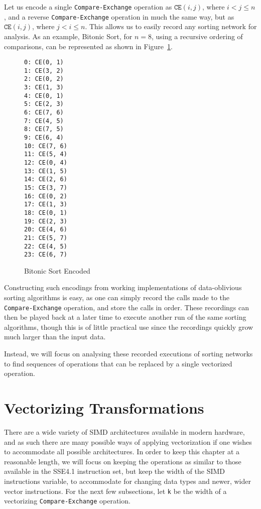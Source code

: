 Let us encode a single \texttt{Compare-Exchange} operation as $\mathtt{CE}(i,j)$, where $i < j \le n$, and a reverse \texttt{Compare-Exchange} operation in much the same way, but as  $\mathtt{CE}(i,j)$, where $j < i \le n$. This allows us to easily record any sorting network for analysis. As an example, Bitonic Sort, for $n = 8$, using a recursive ordering of comparisons, can be  represented as shown in Figure~\ref{fig:BitonicCE}.

\begin{figure}
\begin{multicols}{3}
\begin{verbatim}
0: CE(0, 1)
1: CE(3, 2)
2: CE(0, 2)
3: CE(1, 3)
4: CE(0, 1)
5: CE(2, 3)
6: CE(7, 6)
7: CE(4, 5)
8: CE(7, 5)
9: CE(6, 4)
10: CE(7, 6)
11: CE(5, 4)
12: CE(0, 4)
13: CE(1, 5)
14: CE(2, 6)
15: CE(3, 7)
16: CE(0, 2)
17: CE(1, 3)
18: CE(0, 1)
19: CE(2, 3)
20: CE(4, 6)
21: CE(5, 7)
22: CE(4, 5)
23: CE(6, 7)
\end{verbatim}
\end{multicols}
\caption{Bitonic Sort Encoded}
\label{fig:BitonicCE}
\end{figure}

Constructing such encodings from working implementations of data-oblivious sorting algorithms is easy, as one can simply record the calls made to the \texttt{Compare-Exchange} operation, and store the calls in order. These recordings can then be played back at a later time to execute another run of the same sorting algorithms, though this is of little practical use since the recordings quickly grow much larger than the input data.

Instead, we will focus on analysing these recorded executions of sorting networks to find sequences of operations that can be replaced by a single vectorized operation.

\section{Vectorizing Transformations} 

There are a wide variety of SIMD architectures available in modern hardware, and as such there are many possible ways of applying vectorization if one wishes to accommodate all possible architectures. In order to keep this chapter at a reasonable length, we will focus on keeping the operations as similar to those available in the SSE4.1 instruction set, but keep the width of the SIMD instructions variable, to accommodate for changing data types and newer, wider vector instructions.
For the next few subsections, let \texttt{k} be the width of a vectorizing \texttt{Compare-Exchange} operation.

